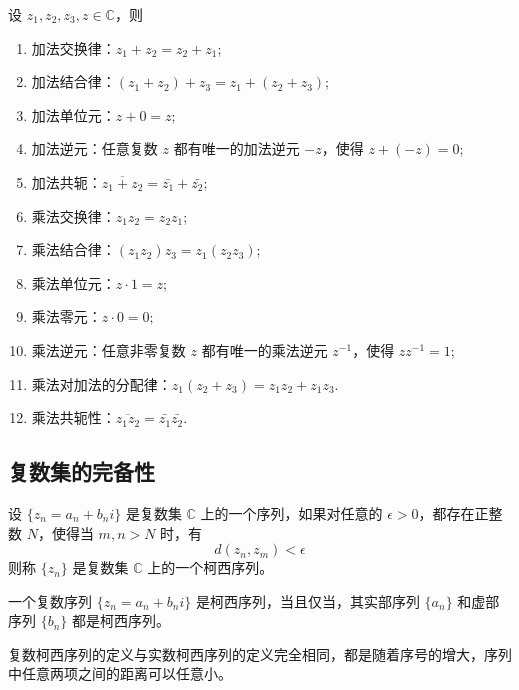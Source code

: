 \begin{proposition}[复数代数运算的性质]
    设 $z_1,z_2,z_3,z\in\mathbb{C}$，则
    \begin{enumerate}
        \item 加法交换律：$z_1 + z_2 = z_2 + z_1$;
        \item 加法结合律：$(z_1 + z_2) + z_3 = z_1 + (z_2 + z_3)$;
        \item 加法单位元：$z + 0 = z$;
        \item 加法逆元：任意复数 $z$ 都有唯一的加法逆元 $-z$，使得 $z + (-z) = 0$;
        \item 加法共轭：$\overline{z_1 + z_2} = \bar{z_1} + \bar{z_2}$;
        \item 乘法交换律：$z_1 z_2 = z_2 z_1$;
        \item 乘法结合律：$(z_1 z_2) z_3 = z_1 (z_2 z_3)$;
        \item 乘法单位元：$z \cdot 1 = z$;
        \item 乘法零元：$z \cdot 0 = 0$;
        \item 乘法逆元：任意非零复数 $z$ 都有唯一的乘法逆元 $z^{-1}$，使得 $z z^{-1} = 1$;
        \item 乘法对加法的分配律：$z_1 (z_2 + z_3) = z_1 z_2 + z_1 z_3$.
        \item 乘法共轭性：$\overline{z_1 z_2} = \bar{z_1} \bar{z_2}$.
    \end{enumerate}
\end{proposition}
\vspace{1em}
\subsection{复数集的完备性}
\begin{definition}
    设 $\{z_n=a_n+b_n i\}$ 是复数集 $\mathbb{C}$ 上的一个序列，如果对任意的 $\epsilon > 0$，都存在正整数 $N$，使得当 $m,n > N$ 时，有
    \[
        d(z_n,z_m) < \epsilon
    \]
    则称 $\{z_n\}$ 是复数集 $\mathbb{C}$ 上的一个柯西序列。
\end{definition}

\begin{proposition}
    一个复数序列 $\{z_n=a_n+b_n i\}$ 是柯西序列，当且仅当，其实部序列 $\{a_n\}$ 和虚部序列 $\{b_n\}$ 都是柯西序列。
\end{proposition}

\begin{note}
    复数柯西序列的定义与实数柯西序列的定义完全相同，都是随着序号的增大，序列中任意两项之间的距离可以任意小。
\end{note}
\vspace{1em}

